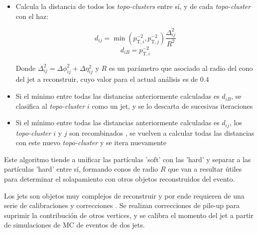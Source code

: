 \begin{itemize}
	\item Calcula la distancia  de todos los \textit{topo-clusters} entre sí, y de cada \textit{topo-cluster} con el haz:

	\begin{equation}
		d_{ij} = \min(p_{\text{T},i}^{-2}, p_{\text{T},j}^{-2})\frac{\Delta_{ij}^{2}}{R^{2}}
	\end{equation}
	\begin{equation}
		d_{iB} = p_{\text{T},i}^{-2}
	\end{equation}

	Donde $\Delta_{ij}^{2} = \Delta\phi_{ij}^{2} + \Delta\eta_{ij}^{2}$ y $R$ es un parámetro que asociado al radio del cono del jet a reconstruir, cuyo valor para el actual análisis es de $0.4$

	\item Si el mínimo entre todas las distancias anteriormente calculadas es $d_{iB}$, se clasifica al \textit{topo-cluster} $i$ como un jet, y se lo descarta de sucesivas iteraciones

	\item Si el mínimo entre todas las distancias anteriormente calculadas es $d_{ij}$, los \textit{topo-cluster} $i$ y $j$ son recombinados , se vuelven a calcular todas las distancias con este nuevo \textit{topo-cluster} y se itera nuevamente

\end{itemize}

Este algoritmo tiende a unificar las partículas 'soft' con las 'hard' y separar a las partículas 'hard' entre sí, formando conos de radio $R$ que van a resultar útiles para determinar el solapamiento con otros objetos reconstruidos del evento.

Los jets son objetos muy complejos de reconstruir y por ende requieren de una serie de calibraciones y correcciones \cite{JETM-2018-05}. Se realizan correcciones de pile-up para suprimir la contribución de otros vertices, y se calibra el momento del jet a partir de simulaciones de MC de eventos de dos jets.

\cite{ATLAS-CONF-2014-018}



